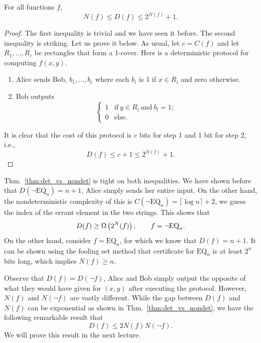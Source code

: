 \documentclass[usletter]{article}
\providecommand\rbrac[1]{\ensuremath \left(#1\right)}
\newcommand{\df}{D(f)}
\newcommand{\dnf}{D(\neg f)}
\newcommand{\nf}{N(f)}
\newcommand{\nnf}{N(\neg f)}
\newcommand{\cf}{C(f)}
\newcommand{\EQ}{\mathrm{EQ}}
\newcommand{\nEQ}{\neg \mathrm{EQ}}
\begin{document}
\begin{theorem}
\label{thm:det_vs_nondet}
For all functions $f$,
$$
\nf \leq \df \leq 2^{\nf} + 1.
$$
\end{theorem}
\begin{proof}
The first inequality is trivial and we have seen it before. The second inequality is striking. Let us prove it below. As usual, let $c = \cf$ and let $R_1, \ldots, R_c$ be rectangles that form a 1-cover. Here is a deterministic protocol for computing $f(x,y)$.
\begin{enumerate}
    \item Alice sends Bob, $b_1, \ldots, b_c$ where each $b_i$ is 1 if $x \in R_i$ and zero otherwise.
    \item Bob outputs
        $$
            \begin{cases}
            1 & \mathrm{if}\ y \in R_l\ \mathrm{and}\ b_l = 1;\\
            0 & \mathrm{else.}
            \end{cases}
         $$
\end{enumerate}
It is clear that the cost of this protocol is $c$ bits for step 1 and 1 bit for step 2, i.e.,
$$
\df \leq c+1 \leq 2^{\nf} + 1.
$$
\end{proof}

\begin{remark}
Thm.~\ref{thm:det_vs_nondet} is tight on both inequalities. We have shown before that $D(\nEQ_n) = n+1$, Alice simply sends her entire input. On the other hand, the nondeterministic complexity of this is $C(\nEQ_n) = \lceil \log n \rceil + 2$, we guess the index of the errant element in the two strings. This shows that
$$
D(f) \geq \Omega \rbrac{2^\nf}; \qquad f = \nEQ_n.
$$
On the other hand, consider $f = \EQ_n$, for which we know that $\df = n+1$. It can be shown using the fooling set method that certificate for $\EQ_n$ is at least $2^n$ bits long, which implies $\nf \geq n$.
\end{remark}

Observe that $\df = \dnf$, Alice and Bob simply output the opposite of what they would have given for $(x,y)$ after executing the protocol. However, $\nf$ and $\nnf$ are vastly different. While the gap between $\df$ and $\nf$ can be exponential as shown in Thm.~\ref{thm:det_vs_nondet}, we have the following remarkable result that
$$
\df \leq 2 \nf \nnf.
$$
We will prove this result in the next lecture.



\end{document}
